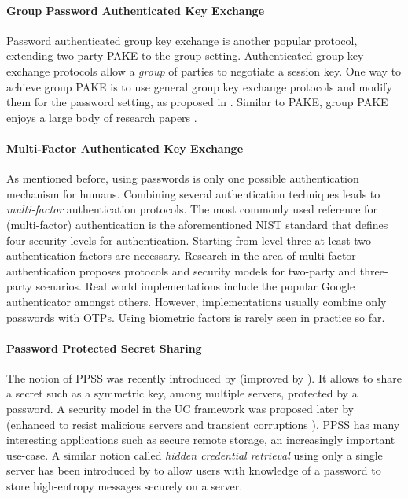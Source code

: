 \paragraph{Group Password Authenticated Key Exchange}
Password authenticated group key exchange is another popular protocol, extending two-party \ac{PAKE} to the group setting.
Authenticated group key exchange protocols allow a \emph{group} of parties to negotiate a session key.
One way to achieve group \ac{PAKE} is to use general group key exchange protocols and modify them for the password setting, as proposed in \cite{Bresson02,BrChPo05}.
Similar to \ac{PAKE}, group \ac{PAKE} enjoys a large body of research papers \cite{Kim2004,Abdalla2006,Bohli2006,Dutta2006,AbdallaP06,AbdallaBVS07,AbdallaCCP09,AbdallaCGP11}.

\paragraph{Multi-Factor Authenticated Key Exchange}
As mentioned before, using passwords is only one possible authentication mechanism for humans.
Combining several authentication techniques leads to \emph{multi-factor} authentication protocols.
The most commonly used reference for (multi-factor) authentication is the aforementioned \ac{NIST} standard \cite{Burr11} that defines four security levels for authentication.
Starting from level three at least two authentication factors are necessary.
Research in the area of multi-factor authentication \cite{PointchevalZ08,SUC10,LiuWM10,HaoC12} proposes protocols and security models for two-party and three-party scenarios.
Real world implementations include the popular Google authenticator \cite{GAuthenticator} amongst others.
However, implementations usually combine only passwords with \acp{OTP}.
Using biometric factors is rarely seen in practice so far.

\paragraph{Password Protected Secret Sharing}
The notion of \acl{PPSS} was recently introduced by \citet{Bagherzandi2011} (improved by \citet{JareckiKK14}).
It allows to share a secret such as a symmetric key, among multiple servers, protected by a password. 
A security model in the \ac{UC} framework was proposed later by \citet{Camenisch2012} (enhanced to resist malicious servers \cite{CamenischLLN14} and transient corruptions \cite{CamenischEN15}).
\ac{PPSS} has many interesting applications such as secure remote storage, an increasingly important use-case.
A similar notion called \emph{hidden credential retrieval} using only a single server has been introduced by \citet{Boyen09} to allow users with knowledge of a password to store high-entropy messages securely on a server.


